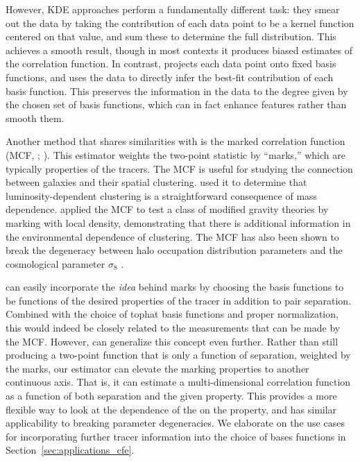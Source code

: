 However, KDE approaches perform a fundamentally different task: they smear out the data by taking the contribution of each data point to be a kernel function centered on that value, and sum these to determine the full distribution.
This achieves a smooth result, though in most contexts it produces biased estimates of the correlation function.
In contrast, \est projects each data point onto fixed basis functions, and uses the data to directly infer the best-fit contribution of each basis function.
This preserves the information in the data to the degree given by the chosen set of basis functions, which can in fact enhance features rather than smooth them.

Another method that shares similarities with \est is the marked correlation function (MCF, \citealt{Beisbart2000}; \citealt{Sheth2005}).
This estimator weights the two-point statistic by ``marks,'' which are typically properties of the tracers.
The MCF is useful for studying the connection between galaxies and their spatial clustering.
\cite{Skibba2006} used it to determine that luminosity-dependent clustering is a straightforward consequence of mass dependence.
\cite{Armijo2018} applied the MCF to test a class of modified gravity theories by marking with local density, demonstrating that there is additional information in the environmental dependence of clustering.
The MCF has also been shown to break the degeneracy between halo occupation distribution parameters and the cosmological parameter $\sigma_8$ \citep{WhitePadmanabhan2009}.

\Est can easily incorporate the \textit{idea} behind marks by choosing the basis functions to be functions of the desired properties of the tracer in addition to pair separation.
Combined with the choice of tophat basis functions and proper normalization, this would indeed be closely related to the measurements that can be made by the MCF.
However, \est can generalize this concept even further. 
Rather than still producing a two-point function that is only a function of separation, weighted by the marks, our estimator can elevate the marking properties to another continuous axis.
That is, it can estimate a multi-dimensional correlation function as a function of both separation and the given property.
This provides a more flexible way to look at the dependence of the \cf on the property, and has similar applicability to breaking parameter degeneracies.
We elaborate on the use cases for incorporating further tracer information into the choice of bases functions in Section~\ref{sec:applications_cfe}.

